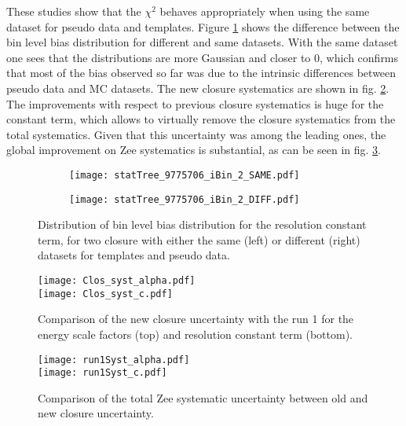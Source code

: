 \begin{enumerate}
These studies show that the $\chi^2$ behaves appropriately when using the same dataset for pseudo data and templates.
Figure \ref{org1646922} shows the difference between the bin level bias distribution for different and same datasets.
With the same dataset one sees that the distributions are more Gaussian and closer to 0, which confirms that most of the bias observed so far was due to the intrinsic differences between pseudo data and MC datasets.
The new closure systematics are shown in fig. \ref{org4b7a948}.
The improvements with respect to previous closure systematics is huge for the constant term, which allows to virtually remove the closure systematics from the total systematics.
Given that this uncertainty was among the leading ones, the global improvement on Zee systematics is substantial, as can be seen in fig. \ref{org628a64a}.




\begin{figure}
\begin{subfigure}[t]{0.49\linewidth}
\texttt{[image: statTree\_9775706\_iBin\_2\_SAME.pdf]}
\end{subfigure}
\begin{subfigure}[t]{0.49\linewidth}
\texttt{[image: statTree\_9775706\_iBin\_2\_DIFF.pdf]}
\end{subfigure}
\caption{\label{org1646922}
Distribution of bin level bias distribution for the resolution constant term, for two closure with either the same (left) or different (right) datasets for templates and pseudo data.}
\end{figure}

\begin{figure}
\centering
\texttt{[image: Clos\_syst\_alpha.pdf]}\\
\texttt{[image: Clos\_syst\_c.pdf]}
\caption{\label{org4b7a948}
Comparison of the new closure uncertainty with the run 1 for the energy scale factors (top) and resolution constant term (bottom). \cite{170712_Guerguichon}}
\end{figure}



\begin{figure}
  \centering
\texttt{[image: run1Syst\_alpha.pdf]}\\
\texttt{[image: run1Syst\_c.pdf]}
\caption{\label{org628a64a}
Comparison of the total Zee systematic uncertainty between old and new closure uncertainty. \cite{170712_Guerguichon}}
\end{figure}

\end{enumerate}
